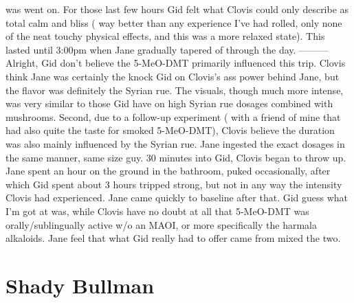 \documentclass[12pt]{book}
\begin{document}
was went on. For those last few hours Gid felt what Clovis could only describe as total calm and bliss ( way better than any experience I've had rolled, only none of the neat touchy physical effects, and this was a more relaxed state). This lasted until 3:00pm when Jane gradually tapered of through the day. --------- Alright, Gid don't believe the 5-MeO-DMT primarily influenced this trip. Clovis think Jane was certainly the knock Gid on Clovis's ass power behind Jane, but the flavor was definitely the Syrian rue. The visuals, though much more intense, was very similar to those Gid have on high Syrian rue dosages combined with mushrooms. Second, due to a follow-up experiment ( with a friend of mine that had also quite the taste for smoked 5-MeO-DMT), Clovis believe the duration was also mainly influenced by the Syrian rue. Jane ingested the exact dosages in the same manner, same size guy. 30 minutes into Gid, Clovis began to throw up. Jane spent an hour on the ground in the bathroom, puked occasionally, after which Gid spent about 3 hours tripped strong, but not in any way the intensity Clovis had experienced. Jane came quickly to baseline after that. Gid guess what I'm got at was, while Clovis have no doubt at all that 5-MeO-DMT was orally/sublingually active w/o an MAOI, or more specifically the harmala alkaloids. Jane feel that what Gid really had to offer came from mixed the two.



\chapter{Shady Bullman}
\end{document}
